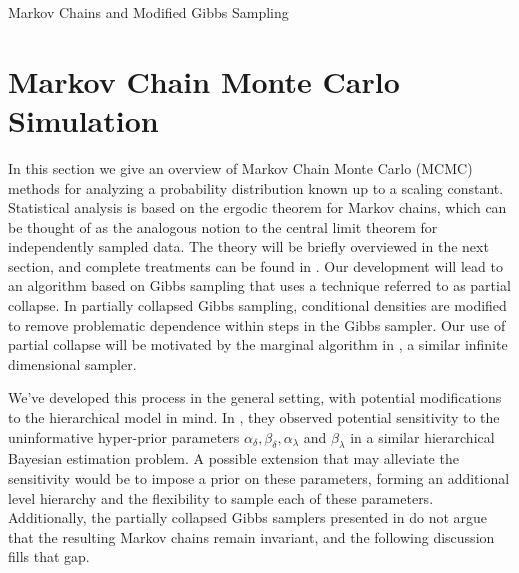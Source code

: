 \begin{chapter}{Markov Chains and Modified Gibbs Sampling}
\section{Markov Chain Monte Carlo Simulation} \label{sec:mcmcTheory}
In this section we give an overview of Markov Chain Monte Carlo (MCMC) methods for analyzing a probability distribution known up to a scaling constant.
Statistical analysis is based on the ergodic theorem for Markov chains, which can be thought of as the analogous notion to the central limit theorem for independently sampled data. 
The theory will be briefly overviewed in the next section, and complete treatments can be found in \citep{robert2013monte}.
Our development will lead to an algorithm based on Gibbs sampling that uses a technique referred to as partial collapse.  
In partially collapsed Gibbs sampling, conditional densities are modified to remove problematic dependence within steps in the Gibbs sampler.
Our use of partial collapse will be motivated by the marginal algorithm in \citep{agapiou2014analysis}, a similar infinite dimensional sampler.

We've developed this process in the general setting, with potential modifications to the hierarchical model in mind.
In \citep{howard2016bayesian}, they observed potential sensitivity to the uninformative hyper-prior parameters $\alpha_\delta,\beta_\delta,\alpha_\lambda$ and $\beta_\lambda$ in a similar hierarchical Bayesian estimation problem.
A possible extension that may alleviate the sensitivity would be to impose a prior on these parameters, forming an additional level hierarchy and the flexibility to sample each of these parameters.
Additionally, the partially collapsed Gibbs samplers presented in \citep{van2015metropolis,van2008partially} do not argue that the resulting Markov chains remain invariant, and the following discussion fills that gap.


\end{chapter}
